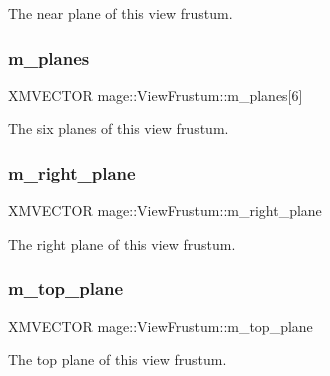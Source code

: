The near plane of this view frustum. \hypertarget{structmage_1_1_view_frustum_a671ec972dbd87a714cfd114a57d47949}{}\label{structmage_1_1_view_frustum_a671ec972dbd87a714cfd114a57d47949} 
\subsubsection{\texorpdfstring{m\+\_\+planes}{m\_planes}}
{\footnotesize\ttfamily X\+M\+V\+E\+C\+T\+OR mage\+::\+View\+Frustum\+::m\+\_\+planes\mbox{[}6\mbox{]}}

The six planes of this view frustum. \hypertarget{structmage_1_1_view_frustum_a95718f7a8fdd743872b93904e99b4268}{}\label{structmage_1_1_view_frustum_a95718f7a8fdd743872b93904e99b4268} 
\subsubsection{\texorpdfstring{m\+\_\+right\+\_\+plane}{m\_right\_plane}}
{\footnotesize\ttfamily X\+M\+V\+E\+C\+T\+OR mage\+::\+View\+Frustum\+::m\+\_\+right\+\_\+plane}

The right plane of this view frustum. \hypertarget{structmage_1_1_view_frustum_a82076a48eaa7ed305a0a1c43246f93d4}{}\label{structmage_1_1_view_frustum_a82076a48eaa7ed305a0a1c43246f93d4} 
\subsubsection{\texorpdfstring{m\+\_\+top\+\_\+plane}{m\_top\_plane}}
{\footnotesize\ttfamily X\+M\+V\+E\+C\+T\+OR mage\+::\+View\+Frustum\+::m\+\_\+top\+\_\+plane}

The top plane of this view frustum. 